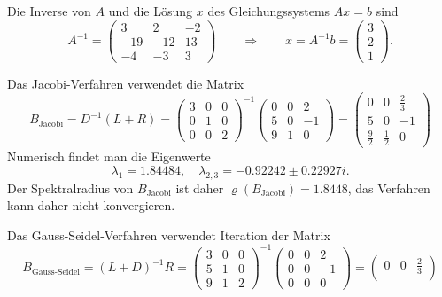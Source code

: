 \begin{loesung}

\begin{teilaufgaben}
\item
Die Inverse von $A$ und die Lösung $x$ des Gleichungssystems $Ax=b$ sind
\[
A^{-1}
=
\begin{pmatrix}
   3&   2&  -2\\
 -19& -12&  13\\
  -4&  -3&   3
\end{pmatrix}
\qquad\Rightarrow\qquad
x=A^{-1}b=
\begin{pmatrix}
3\\2\\1
\end{pmatrix}.
\]
\item
Das Jacobi-Verfahren verwendet die Matrix
\[
B_{\text{Jacobi}}
=
D^{-1}(L+R)
=
\begin{pmatrix}
 3&  0&  0 \\
 0&  1&  0 \\
 0&  0&  2
\end{pmatrix}^{-1}
\begin{pmatrix}
 0&  0&  2 \\
 5&  0& -1 \\
 9&  1&  0
\end{pmatrix}
=
\begin{pmatrix}
   0    &   0    &\frac23\\
   5    &   0    & -1    \\
\frac92 &\frac12 &  0 
\end{pmatrix}
\]
Numerisch findet man die Eigenwerte
\[
\lambda_1 =    1.84484,
\quad
\lambda_{2,3} =
  -0.92242 \pm 0.22927i.
\]
Der Spektralradius von $B_{\text{Jacobi}}$ ist daher
$\varrho(B_{\text{Jacobi}}) = 1.8448$, das Verfahren kann daher nicht
konvergieren.
\item
Das Gauss-Seidel-Verfahren verwendet Iteration der Matrix
\[
B_{\text{Gauss-Seidel}}
=
(L+D)^{-1} R
=
\begin{pmatrix}
   3&  0&  0 \\
   5&  1&  0 \\
   9&  1&  2
\end{pmatrix}^{-1}
\begin{pmatrix}
   0&  0&  2 \\
   0&  0& -1 \\
   0&  0&  0
\end{pmatrix}
=
\begin{pmatrix}
0&0&\frac23\\

\end{pmatrix}\]
\end{teilaufgaben}
\end{loesung}
